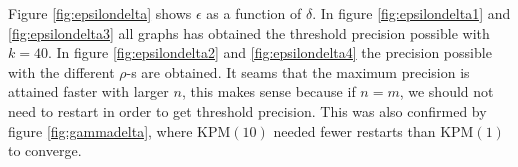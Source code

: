 Figure \ref{fig:epsilondelta} shows $\epsilon$ as a function of $\delta$. In figure \ref{fig:epsilondelta1} and \ref{fig:epsilondelta3} all graphs has obtained the threshold precision possible with $k=40$. In
figure \ref{fig:epsilondelta2} and \ref{fig:epsilondelta4} the precision possible with the different $\rho$-s are obtained. It seams that the maximum precision is attained faster with larger $n$, this makes sense because if $n = m$, we should not need to restart in order to get threshold precision. This was also confirmed by figure \ref{fig:gammadelta}, where KPM$(10)$ needed fewer restarts than KPM$(1)$ to converge. 
